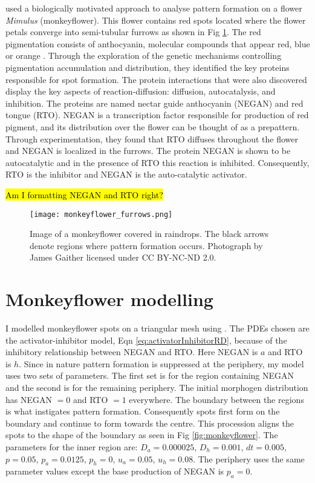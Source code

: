\cite{Yuan2019} used a biologically motivated approach to analyse pattern formation on a flower \textit{Mimulus} (monkeyflower). This flower contains red spots located where the flower petals converge into semi-tubular furrows as shown in Fig \ref{fig:monkeyflower_real}. The red pigmentation consists of anthocyanin, molecular compounds that appear red, blue or orange \cite{bayer1966}. Through the exploration of the genetic mechanisms controlling pigmentation accumulation and distribution, they identified the key proteins responsible for spot formation. The protein interactions that were also discovered display the key aspects of reaction-diffusion: diffusion, autocatalysis, and inhibition. The proteins are named nectar guide anthocyanin (NEGAN) and red tongue (RTO). NEGAN is a transcription factor responsible for production of red pigment, and its distribution over the flower can be thought of as a prepattern. Through experimentation, they found that RTO diffuses throughout the flower and NEGAN is localized in the furrows. The protein NEGAN is shown to be autocatalytic and in the presence of RTO this reaction is inhibited. Consequently, RTO is the inhibitor and NEGAN is the auto-catalytic activator.

\hl{Am I formatting NEGAN and RTO right?}

\begin{figure}[ht]
	\centering
	\texttt{[image: monkeyflower\_furrows.png]}
	\caption{Image of a monkeyflower covered in raindrops. The black arrows denote regions where pattern formation occurs. Photograph by James Gaither licensed under CC BY-NC-ND 2.0.}
	\label{fig:monkeyflower_real}
\end{figure}

\section{Monkeyflower modelling}
I modelled monkeyflower spots on a triangular mesh using \ProgramName{}. The PDEs chosen are the activator-inhibitor model, Eqn \eqref{eq:activatorInhibitorRD}, because of the inhibitory relationship between NEGAN and RTO. Here NEGAN is $a$ and RTO is $h$. Since in nature pattern formation is suppressed at the periphery, my model uses two sets of parameters. The first set is for the region containing NEGAN and the second is for the remaining periphery. The initial morphogen distribution has NEGAN $= 0$ and RTO $= 1$ everywhere. The boundary between the regions is what instigates pattern formation. Consequently spots first form on the boundary and continue to form towards the centre. This procession aligns the spots to the shape of the boundary as seen in Fig \ref{fig:monkeyflower}. The parameters for the inner region are: $D_a=0.000025$, $D_h=0.001$, $dt=0.005$, $p=0.05$, $p_a=0.0125$, $p_h=0$, $u_a=0.05$, $u_h=0.08$. The periphery uses the same parameter values except the base production of NEGAN is $p_a=0$.

